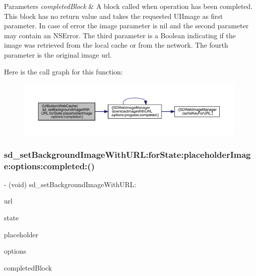 \begin{DoxyParams}{Parameters}
{\em completed\+Block} & A block called when operation has been completed. This block has no return value and takes the requested U\+I\+Image as first parameter. In case of error the image parameter is nil and the second parameter may contain an N\+S\+Error. The third parameter is a Boolean indicating if the image was retrieved from the local cache or from the network. The fourth parameter is the original image url. \\
\hline
\end{DoxyParams}
Here is the call graph for this function\+:\nopagebreak
\begin{figure}[H]
\begin{center}
\leavevmode
\includegraphics[width=350pt]{category_u_i_button_07_web_cache_08_a02dc89ea855c63ac6fdbc7595f13e577_cgraph}
\end{center}
\end{figure}
\mbox{\label{category_u_i_button_07_web_cache_08_a02dc89ea855c63ac6fdbc7595f13e577}} 
\subsubsection{\texorpdfstring{sd\+\_\+set\+Background\+Image\+With\+U\+R\+L\+:for\+State\+:placeholder\+Image\+:options\+:completed\+:()}{sd\_setBackgroundImageWithURL:forState:placeholderImage:options:completed:()}\hspace{0.1cm}{\footnotesize\ttfamily [3/3]}}
{\footnotesize\ttfamily -\/ (void) sd\+\_\+set\+Background\+Image\+With\+U\+R\+L\+: \begin{DoxyParamCaption}\item[{(N\+S\+U\+RL $\ast$)}]{url }\item[{forState:(U\+I\+Control\+State)}]{state }\item[{placeholderImage:(U\+I\+Image $\ast$)}]{placeholder }\item[{options:(S\+D\+Web\+Image\+Options)}]{options }\item[{completed:(S\+D\+Web\+Image\+Completion\+Block)}]{completed\+Block }\end{DoxyParamCaption}}

